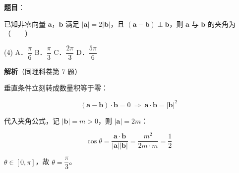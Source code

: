 \begin{answer}

\textbf{题目}：

已知非零向量 $\boldsymbol a$，$\boldsymbol b$ 满足 $|\boldsymbol a|=2|\boldsymbol b|$，且 $(\boldsymbol a-\boldsymbol b)\perp\boldsymbol b$，则 $\boldsymbol a$ 与 $\boldsymbol b$ 的夹角为\mbox{（　　）}

\begin{gkopts}(4)
\task A．$\dfrac\pi6$
\task B．$\dfrac\pi3$
\task C．$\dfrac{2\pi}3$
\task D．$\dfrac{5\pi}6$
\end{gkopts}

\textbf{解析}（同理科卷第 7 题）

垂直条件立刻转成数量积等于零：

\nopagebreak[4]
\[(\boldsymbol a-\boldsymbol b)\cdot\boldsymbol b=0\ \Longrightarrow\ \boldsymbol a\cdot\boldsymbol b=|\boldsymbol b|^{2}\]

代入夹角公式，记 $|\boldsymbol b|=m>0$，则 $|\boldsymbol a|=2m$：

\nopagebreak[4]
\[\cos\theta=\frac{\boldsymbol a\cdot\boldsymbol b}{|\boldsymbol a||\boldsymbol b|}=\frac{m^{2}}{2m\cdot m}=\frac12\]

$\theta\in[0,\pi]$，故 $\theta=\dfrac\pi3$。


\par\medskip

\end{answer}
